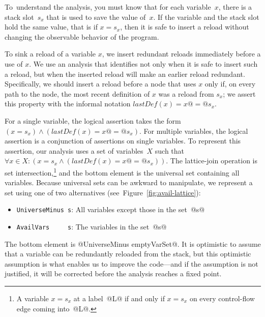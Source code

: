 \documentclass[blockstyle,preprint,nocopyrightspace]{sigplanconf}
\newcommand\slotof[1]{\ensuremath{s_{#1}}}
\newcommand{\authornote}[1]{{\em #1}}
\def\authornote#1{\unskip\relax}
\newcommand{\simon}[1]{\authornote{SLPJ: #1}}
\newcommand{\norman}[1]{\authornote{NR: #1}}
\let\remark\norman
\newcommand\figref[1]{Figure~\ref{fig:#1}}
\begin{document}
To~understand the analysis, you must know that for each variable~$x$,
there is a stack slot~\slotof x that is used to save the value of~$x$.
%
\remark{Changing ``register'' to
``variable'' makes the example easier to understand and hides a
GHC-ism, but there's a slippery slope here.}
%
If the variable and the stack slot hold the same value,
that is if $x = \slotof x$,
then it is safe to insert a reload without changing the observable
behavior of the program.

To sink a reload of a variable $x$, we insert redundant reloads immediately
before a use of $x$.
We use an analysis that identifies not only when it is safe to insert
such a reload, but when the inserted reload will make an earlier reload redundant.
Specifically, we should insert a reload before a node that uses $x$ only if,
on every path to the node, the most recent definition of $x$ was a reload from
$\slotof x$; we assert this property with the informal notation
$\mathit{lastDef}(x) = x @=@ \slotof x$.

For a single variable, the logical assertion takes the form
\mbox{$(x = \slotof x) \wedge
       (\mathit{lastDef}(x) = x @=@ \slotof x)$}.
For multiple variables, the logical assertion is a conjunction of assertions
on single variables.
To represent this assertion, our analysis uses a 
set of variables~$X$ such that \mbox{$\forall x \in X \mathrel
: (x = \slotof x \wedge (\mathit{lastDef}(x) = x @=@ \slotof x))$}.
The lattice-join operation is set intersection,\footnote
{A variable $x = \slotof x$ at a label~@L@ if and
only if $x = \slotof x$ on every control-flow edge coming into~@L@.}
and the bottom element
is the universal set containing all variables.
\simon{I'm puzzled about why you are treating this example so differently
to constant-prop in Section 3.1.  It looks almost identical to me.  We could
keep a fact for every variable: $x=\bot$ means nothing is known; $x=s_x$ means
x's stack slot is up to date; $x=\top$ means x's stack slot is out of date.
Then keep a finite map as we do for constant prop.  If there is a difference
that drives the rep you have here, let's say so. If the difference is
purely accidental, we should eliminate it.  (Or maybe we don't have time, in
which case we should remark that there is no diff.)}
Because universal sets can be awkward to manipulate, we represent a
set using one of two alternatives
(see~\figref{avail-lattice}):
\begin{itemize}
\item \texttt{UniverseMinus~s}: All variables except those in the set~@s@
\item \texttt{AvailVars~~~~~s}: The variables in the set~@s@
\end{itemize}
The bottom element is @UniverseMinus emptyVarSet@.
It is optimistic to assume that a variable can be redundantly reloaded from the stack,
but this optimistic assumption is what enables us to improve the
code---and if the assumption is not justified, it will be corrected before
the analysis reaches a fixed point.
\end{document}
